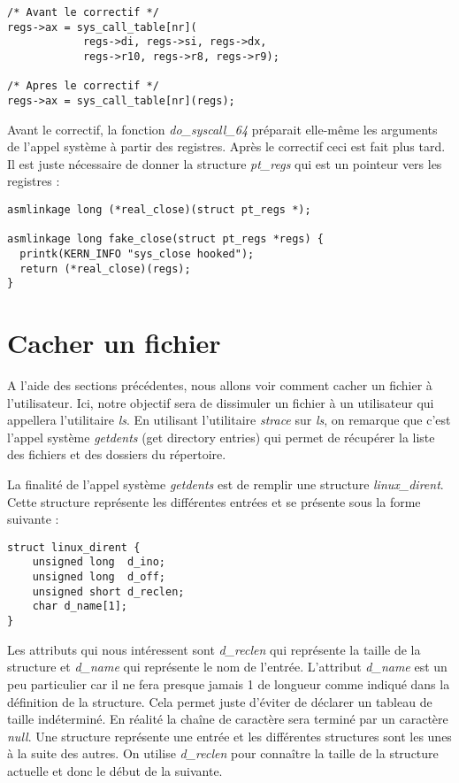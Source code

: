 \documentclass[journal, a4paper]{IEEEtran}
\begin{document}
\begin{lstlisting}[style=CStyle]
/* Avant le correctif */
regs->ax = sys_call_table[nr](
			regs->di, regs->si, regs->dx,
			regs->r10, regs->r8, regs->r9);

/* Apres le correctif */
regs->ax = sys_call_table[nr](regs);
\end{lstlisting}
Avant le correctif, la fonction \textit{do\_syscall\_64} préparait elle-même les arguments de l'appel système à partir des registres. Après le correctif ceci est fait plus tard. Il est juste nécessaire de donner la structure \textit{pt\_regs} qui est un pointeur vers les registres :
\begin{lstlisting}[style=CStyle]
asmlinkage long (*real_close)(struct pt_regs *);

asmlinkage long fake_close(struct pt_regs *regs) {
  printk(KERN_INFO "sys_close hooked");
  return (*real_close)(regs);
}
\end{lstlisting}

\section{Cacher un fichier}

A l'aide des sections précédentes, nous allons voir comment cacher un fichier à l'utilisateur. Ici, notre objectif sera de dissimuler un fichier à un utilisateur qui appellera l'utilitaire \textit{ls}. En utilisant l'utilitaire \textit{strace} sur \textit{ls}, on remarque que c'est l'appel système \textit{getdents} (get directory entries) qui permet de récupérer la liste des fichiers et des dossiers du répertoire.

La finalité de l'appel système \textit{getdents} est de remplir une structure \textit{linux\_dirent}. Cette structure représente les différentes entrées et se présente sous la forme suivante : 
\begin{lstlisting}[style=CStyle]
 struct linux_dirent {
	unsigned long  d_ino;
	unsigned long  d_off;
	unsigned short d_reclen;
	char d_name[1]; 
}
\end{lstlisting}
Les attributs qui nous intéressent sont \textit{d\_reclen} qui représente la taille de la structure et \textit{d\_name} qui représente le nom de l'entrée. L'attribut \textit{d\_name} est un peu particulier car il ne fera presque jamais 1 de longueur comme indiqué dans la définition de la structure. Cela permet juste d'éviter de déclarer un tableau de taille indéterminé. En réalité la chaîne de caractère sera terminé par un caractère \textit{null}. Une structure représente une entrée et les différentes structures sont les unes à la suite des autres. On utilise \textit{d\_reclen} pour connaître la taille de la structure actuelle et donc le début de la suivante.
\end{document}
